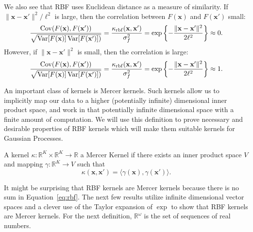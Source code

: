We also see that RBF uses Euclidean distance as a measure of similarity.
If $\lVert \mathbf{x} - \mathbf{x}' \rVert^2 / \ell^2$ is large, then the correlation between $F(\mathbf{x})$ and $F(\mathbf{x}')$ small:
\begin{equation*}
    \frac{\operatorname{Cov}(F(\mathbf{x}), F(\mathbf{x}'))}{\sqrt{\operatorname{Var}[F(\mathbf{x})]\operatorname{Var}[F(\mathbf{x}')])}} = \frac{\kappa_{\mathrm{rbf}}(\mathbf{x}, \mathbf{x}')}{\sigma_f^2} = \exp \left\{ -\frac{ \lVert \mathbf{x} - \mathbf{x}' \rVert^2 }{ 2\ell^2 } \right\} \approx 0.
\end{equation*}
However, if $\lVert \mathbf{x} - \mathbf{x}' \rVert^2$ is small, then the correlation is large:
\begin{equation*}
    \frac{\operatorname{Cov}(F(\mathbf{x}), F(\mathbf{x}'))}{\sqrt{\operatorname{Var}[F(\mathbf{x})]\operatorname{Var}[F(\mathbf{x}')])}}
    = \frac{\kappa_{\mathrm{rbf}}(\mathbf{x}, \mathbf{x}')}{\sigma_f^2} = \exp \left\{ -\frac{ \lVert \mathbf{x} - \mathbf{x}' \rVert^2 }{ 2\ell^2 } \right\} \approx 1.
\end{equation*}

An important class of kernels is Mercer kernels.
Such kernels allow us to implicitly map our data to a higher (potentially infinite) dimensional inner product space, and work in that potentially infinite dimensional space with a finite amount of computation.
We will use this definition to prove necessary and desirable properties of RBF kernels which will make them suitable kernels for Gaussian Processes.

\begin{definition}
    A kernel $\kappa: \mathbb{R}^{K} \times \mathbb{R}^{K} \to \mathbb{R}$
    a Mercer Kernel if there exists an inner product space
    $V$ and mapping $\gamma : \mathbb{R}^{K} \to V$ such that
    \begin{equation*}
        \kappa(\mathbf{x}, \mathbf{x}') = \langle \gamma(\mathbf{x}), \gamma(\mathbf{x}') \rangle.
    \end{equation*}
\end{definition}

It might be surprising that RBF kernels are Mercer kernels because there is no sum in Equation~\ref{eq:rbf}.
The next few results utilize infinite dimensional vector spaces and a clever use of the Taylor expansion of $\exp$ to show that RBF kernels are Mercer kernels.
For the next definition, $\mathbb{R}^{\omega}$ is the set of sequences of real numbers.

